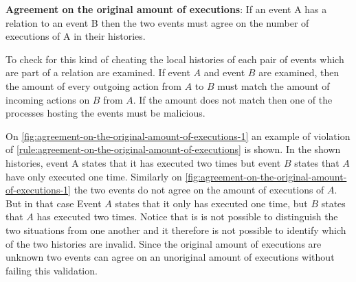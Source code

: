 	\begin{ruledef}
		\textbf{Agreement on the original amount of executions}: If an event A has a relation to an event B then the two events must agree on the number of executions of A in their histories.%
		\label{rule:agreement-on-the-original-amount-of-executions}
	\end{ruledef}
	
	\noindent To check for this kind of cheating the local histories of each pair of events which are part of a relation are examined. If event $A$ and event $B$ are examined, then the amount of every outgoing action from $A$ to $B$ must match the amount of incoming actions on $B$ from $A$. If the amount does not match then one of the processes hosting the events must be malicious.
	
	\newpar On \autoref{fig:agreement-on-the-original-amount-of-executions-1} an example of violation of \autoref{rule:agreement-on-the-original-amount-of-executions} is shown. In the shown histories, event A states that it has executed two times but event $B$ states that $A$ have only executed one time. Similarly on \autoref{fig:agreement-on-the-original-amount-of-executions-1} the two events do not agree on the amount of executions of $A$. But in that case Event $A$ states that it only has executed one time, but $B$ states that $A$ has executed two times. Notice that is is not possible to distinguish the two situations from one another and it therefore is not possible to identify which of the two histories are invalid. Since the original amount of executions are unknown two events can agree on an unoriginal amount of executions without failing this validation. 
	
